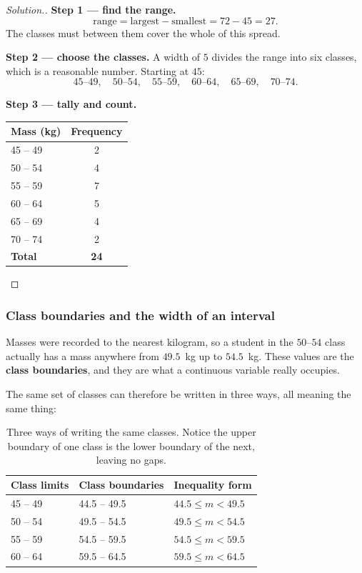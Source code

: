 \documentclass[11pt,a4paper]{article}
\theoremstyle{definition}
\newenvironment{solution}
  {\renewcommand{\qedsymbol}{}\begin{proof}[\textit{Solution}.]}
  {\end{proof}}
\begin{document}
\begin{solution}
\textbf{Step 1 --- find the range.}
$$\text{range}=\text{largest}-\text{smallest}=72-45=27.$$
The classes must between them cover the whole of this spread.

\textbf{Step 2 --- choose the classes.} A width of $5$ divides the range into six
classes, which is a reasonable number. Starting at $45$:
$$45\text{--}49,\quad 50\text{--}54,\quad 55\text{--}59,\quad 60\text{--}64,\quad
65\text{--}69,\quad 70\text{--}74.$$

\textbf{Step 3 --- tally and count.}

\begin{table}[H]
\centering
\begin{tabular}{|l|c|}
\hline
Mass (kg) & Frequency\\
\hline
45 -- 49 & 2\\
50 -- 54 & 4\\
55 -- 59 & 7\\
60 -- 64 & 5\\
65 -- 69 & 4\\
70 -- 74 & 2\\
\hline
\textbf{Total} & \textbf{24}\\
\hline
\end{tabular}
\end{table}
\end{solution}

\subsubsection{Class boundaries and the width of an interval}

Masses were recorded to the nearest kilogram, so a student in the $50$--$54$ class
actually has a mass anywhere from $49.5$~kg up to $54.5$~kg. These values are the
\textbf{class boundaries}, and they are what a continuous variable really occupies.

The same set of classes can therefore be written in three ways, all meaning the same
thing:

\begin{table}[H]
\centering
\begin{tabular}{|l|l|l|}
\hline
Class limits & Class boundaries & Inequality form\\
\hline
45 -- 49 & 44.5 -- 49.5 & $44.5\leq m<49.5$\\
50 -- 54 & 49.5 -- 54.5 & $49.5\leq m<54.5$\\
55 -- 59 & 54.5 -- 59.5 & $54.5\leq m<59.5$\\
60 -- 64 & 59.5 -- 64.5 & $59.5\leq m<64.5$\\
\hline
\end{tabular}
\caption{Three ways of writing the same classes. Notice the upper boundary of one class is the lower boundary of the next, leaving no gaps.}
\end{table}
\end{document}
